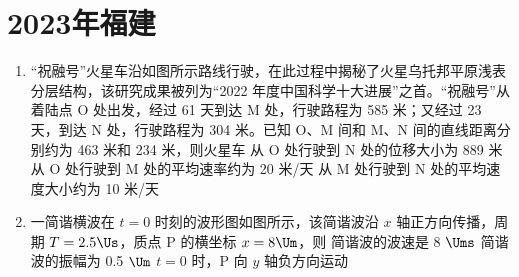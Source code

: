 \documentclass[\gkver]{gaokaozhenti}
\begin{document}
\chapter{2023年福建}

\begin{enumerate}
\item
“祝融号”火星车沿如图所示路线行驶，在此过程中揭秘了火星乌托邦平原浅表分层结构，该研究成果被列为“2022 年度中国科学十大进展”之首。“祝融号”从着陆点 O 处出发，经过 61 天到达 M 处，行驶路程为 585 米；又经过 23 天，到达 N 处，行驶路程为 304 米。已知 O、M 间和 M、N 间的直线距离分别约为 463 米和 234 米，则火星车
{从 O 处行驶到 N 处的位移大小为 889 米}
{从 O 处行驶到 M 处的平均速率约为 20 米/天}
{从 M 处行驶到 N 处的平均速度大小约为 10 米/天}

\item
一简谐横波在 $t = 0$ 时刻的波形图如图所示，该简谐波沿 $x$ 轴正方向传播，周期 $T = 2.5\Us$，质点 P 的横坐标 $x = 8\Um$，则
{简谐波的波速是 8 $\Ums$}
{简谐波的振幅为 0.5 $\Um$}
{$t = 0$ 时，P 向 $y$ 轴负方向运动}
\end{enumerate}
\end{document}
